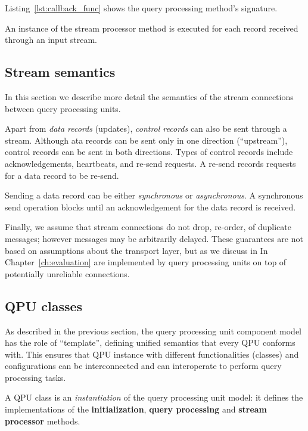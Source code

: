 \noindent
Listing~\ref{lst:callback_func} shows the query processing method's signature.

An instance of the stream processor method is executed for each record received through an input stream.

\subsection{Stream semantics}

In this section we describe more detail the semantics of the stream connections between query processing units.

\medskip
\noindent
Apart from \textit{data records} (updates), \textit{control records} can also be sent through a stream.
Although ata records can be sent only in one direction (``upstream''), control records can be sent in both directions.
Types of control records include acknowledgements, heartbeats, and re-send requests.
A re-send records requests for a data record to be re-send.

\medskip
\noindent
Sending a data record can be either \textit{synchronous} or \textit{asynchronous}.
A synchronous send operation blocks until an acknowledgement for the data record is received.

\medskip
\noindent
Finally, we assume that stream connections do not drop, re-order, of duplicate messages;
however messages may be arbitrarily delayed.
These guarantees are not based on assumptions about the transport layer, but as we discuss in In Chapter~\ref{ch:evaluation}
are implemented by query processing units on top of potentially unreliable connections.

\subsection{QPU classes}
\label{sec:qpu_classes}

As described in the previous section, the query processing unit component model has the role of ``template'',
defining unified semantics that every QPU conforms with.
This ensures that QPU instance with different functionalities (classes) and configurations can be interconnected and
can interoperate to perform query processing tasks.

A QPU class is an \textit{instantiation} of the query processing unit model:
it defines the implementations of the \textbf{initialization}, \textbf{query processing} and \textbf{stream processor}
methods.

